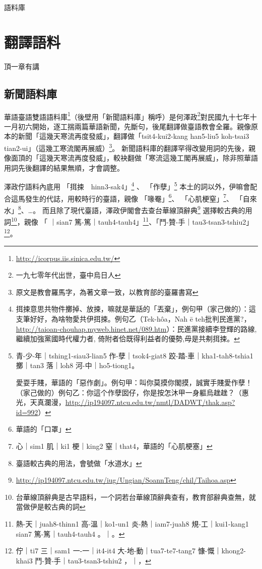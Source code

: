 \documentclass[final,oneside,onecolumn,12pt,a4paper]{book}%
\begin{document}
語料庫


\chapter{翻譯語料}
\label{章：翻譯語料}

頂一章有講

\section{新聞語料庫}
\label{節：新聞語料庫}
華語臺語雙語語料庫\footnote{\url{http://icorpus.iis.sinica.edu.tw/}}（後壁用「新聞語料庫」稱呼）是何澤政\footnote{一九七零年代出世，臺中烏日人}對民國九十七年十一月初六開始，逐工揣兩篇華語新聞，先斷句，後尾翻譯做臺語教會全羅。親像原本的新聞「這幾天寒流再度發威」，翻譯做「tsit4-kui2-kang han5-liu5 koh-tsai3 tian2-ui」（這幾工寒流閣再展威）\footnote{原文是教會羅馬字，為著文章一致，以教育部的臺羅書寫}。
新聞語料庫的翻譯罕得改變用詞的先後，親像面頂的「這幾天寒流再度發威」，較袂翻做「寒流這幾工閣再展威」，除非照華語用詞先後翻譯的結果無順，才會調整。

澤政佇語料內底用
「挕捒　hinn3-sak4」\footnote{挕捒意思共物件擲掉、放捒，嘛就是華話的「丟棄」，例句甲（家己做的）：這支筆好好，為啥物愛共伊挕捒。例句乙（Tek-hôa，Nah ē teh批判民進黨?，\url{http://taioan-chouhap.myweb.hinet.net/089.htm}）：民進黨接續李登輝的路線, 繼續加強黨國時代權力者, 倚附者佮既得利益者的優勢,毋是共刜挕捒。}
、
「作孽」\footnote{
青-少-年｜tshing1-siau3-lian5 作-孽｜tsok4-giat8 跤-踏-車｜kha1-tah8-tshia1 擲｜tan3 落｜loh8 河-中｜ho5-tiong1。

愛耍手賤，華語的「惡作劇」。例句甲：叫你莫摸你閣摸，誠實手賤愛作孽！（家己做的）例句乙：你這个作孽囡仔，你是按怎沐甲一身軀烏趖趖？（惠光，天真瀾漫，\url{http://ip194097.ntcu.edu.tw/nmtl/DADWT/thak.asp?id=992}）}
本土的詞以外，伊嘛會配合這馬發生的代誌，用較時行的臺語，親像
「喙罨」\footnote{華語的「口罩」}、
「心肌梗窒」\footnote{心｜sim1 肌｜ki1 梗｜king2 窒｜that4，華語的「心肌梗塞」}、
「自來水」\footnote{臺語較古典的用法，會號做「水道水」}、…。
而且除了現代臺語，澤政伊閣會去查台華線頂辭典\footnote{\url{http://ip194097.ntcu.edu.tw/iug/Ungian/SoannTeng/chil/Taihoa.asp}}
選擇較古典的用詞\footnote{台華線頂辭典是古早語料，一个詞若台華線頂辭典查有，教育部辭典查無，就當做伊是較古典的詞}，親像
「𤺪｜sian7 篤-篤｜tauh4-tauh4」\footnote{熱-天｜juah8-thinn1 高-溫｜ko1-un1 炎-熱｜iam7-juah8 規-工｜kui1-kang1 𤺪｜sian7 篤-篤｜tauh4-tauh4 。｜。}、「鬥-贊-手｜tau3-tsan3-tshiu2」\footnote{佇｜ti7 三｜sam1 一-一｜it4-it4 大-地-動｜tua7-te7-tang7 慷-慨｜khong2-khai3 鬥-贊-手｜tau3-tsan3-tshiu2 ，｜，}。
\end{document}

